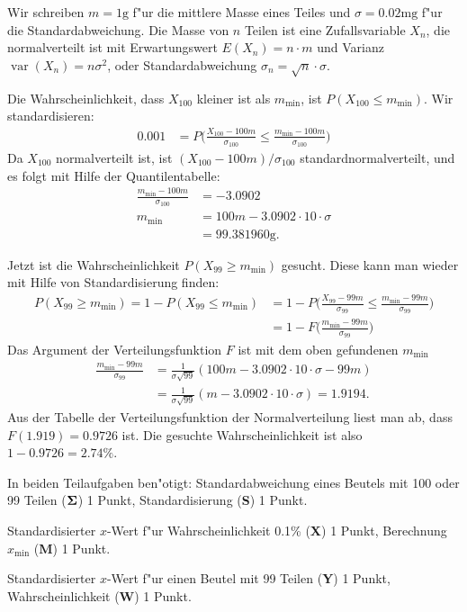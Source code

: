 \begin{loesung}
Wir schreiben $m=1\text{g}$ f"ur die mittlere Masse eines Teiles und
$\sigma=0.02\text{mg}$ f"ur die Standardabweichung.
Die Masse von $n$ Teilen ist eine Zufallsvariable $X_n$, die normalverteilt
ist mit Erwartungswert $E(X_n)=n\cdot m$ und Varianz
$\operatorname{var}(X_n)=n\sigma^2$, oder Standardabweichung
$\sigma_n=\sqrt{n}\cdot\sigma$.
\begin{teilaufgaben}
\item Die Wahrscheinlichkeit, dass $X_{100}$ kleiner ist als $m_{\text{min}}$,
ist
\(
P(X_{100}\le m_{\text{min}})
\). Wir standardisieren:
\begin{align*}
0.001 &= P\biggl(
\frac{X_{100}-100m}{\sigma_{100}}\le \frac{m_{\text{min}}-100m}{\sigma_{100}}
\biggr)
\end{align*}
Da $X_{100}$ normalverteilt ist, ist $(X_{100}-100m)/\sigma_{100}$
standardnormalverteilt, und es folgt mit Hilfe der Quantilentabelle:
\begin{align*}
\frac{m_{\text{min}}-100m}{\sigma_{100}}&=-3.0902\\
m_{\text{min}}&=100m-3.0902\cdot 10\cdot \sigma
\\
&=99.381960\text{g}.
\end{align*}
\item Jetzt ist die Wahrscheinlichkeit $P(X_{99} \ge m_{\text{min}})$ gesucht.
Diese kann man wieder mit Hilfe von Standardisierung finden:
\begin{align*}
P(X_{99} \ge m_{\text{min}})
=
1-P(X_{99} \le m_{\text{min}})
&=
1-P\biggl(
\frac{X_{99}-99m}{\sigma_{99}}\le \frac{m_{\text{min}} - 99m}{\sigma_{99}}
\biggr)
\\
&=1-F\biggl(
\frac{m_{\text{min}} - 99m}{\sigma_{99}}
\biggr)
\end{align*}
Das Argument der Verteilungsfunktion $F$ ist mit dem oben gefundenen
$m_{\text{min}}$
\begin{align*}
\frac{m_{\text{min}} - 99m}{\sigma_{99}}
&=
\frac1{\sigma\sqrt{99}}(
100m-3.0902\cdot 10\cdot \sigma-99m)\\
&=
\frac1{\sigma\sqrt{99}}(m-3.0902\cdot 10\cdot \sigma)
=1.9194.
\end{align*}
Aus der Tabelle der Verteilungsfunktion der Normalverteilung liest man
ab, dass $F(1.919)=0.9726$ ist. Die gesuchte Wahrscheinlichkeit ist
also $1-0.9726=2.74\%$.
\qedhere
\end{teilaufgaben}
\end{loesung}

\begin{bewertung}
In beiden Teilaufgaben ben"otigt:
Standardabweichung eines Beutels  mit 100 oder 99 Teilen
($\bf \Sigma$) 1 Punkt,
Standardisierung (\textbf{S}) 1 Punkt.
\begin{teilaufgaben}
\item
Standardisierter $x$-Wert f"ur Wahrscheinlichkeit 0.1\% (\textbf{X}) 1 Punkt,
Berechnung $x_{\text{min}}$ (\textbf{M}) 1 Punkt.
\item
Standardisierter $x$-Wert f"ur einen Beutel mit 99 Teilen (\textbf{Y}) 1 Punkt,
Wahrscheinlichkeit (\textbf{W}) 1 Punkt.
\end{teilaufgaben}
\end{bewertung}

